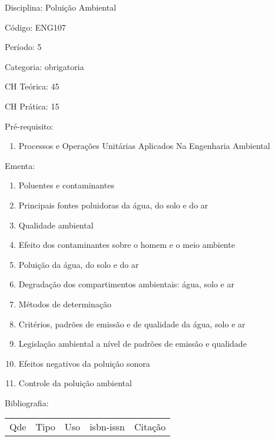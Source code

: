 \documentclass[12pt,a4paper,twoside]{report}
\begin{document}
Disciplina: Poluição Ambiental

Código: ENG107

Período: 5

Categoria: obrigatoria

CH Teórica: 45

CH Prática: 15




Pré-requisito:
\begin{enumerate}
\item Processos e Operações Unitárias Aplicados Na Engenharia Ambiental
\end{enumerate}

Ementa:
\begin{enumerate}
\item Poluentes e contaminantes
\item Principais fontes poluidoras da água, do solo e do ar
\item Qualidade ambiental
\item Efeito dos contaminantes sobre o homem e o meio ambiente
\item Poluição da água, do solo e do ar
\item Degradação dos compartimentos ambientais: água, solo e ar
\item Métodos de determinação
\item Critérios, padrões de emissão e de qualidade da água, solo e ar
\item Legislação ambiental a nível de padrões de emissão e qualidade
\item Efeitos negativos da poluição sonora
\item Controle da poluição ambiental
\end{enumerate}



Bibliografia:


\begin{tabular}{llllp{8cm}}
Qde & Tipo & Uso & isbn-issn & Citação \\
\end{tabular}
\end{document}
